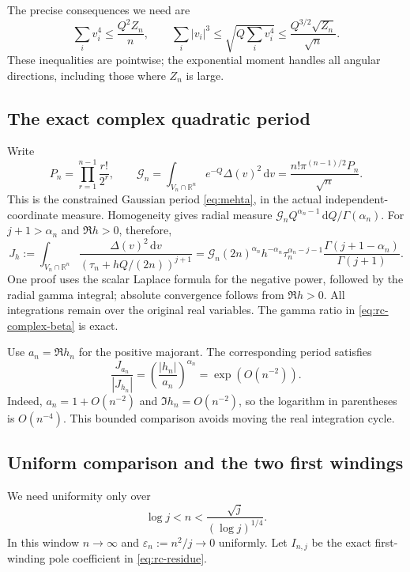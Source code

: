 \documentclass[11pt]{article}
\numberwithin{equation}{section}
\theoremstyle{definition}
\newcommand{\R}{\mathbb R}
\newcommand{\dd}{\,\mathrm d}
\begin{document}
The precise consequences we need are
\begin{equation}\label{eq:rc-angular-power-bounds}
 \sum_i v_i^4\le\frac{Q^2Z_n}{n},\qquad
 \sum_i|v_i|^3
 \le\sqrt{Q\sum_i v_i^4}
 \le\frac{Q^{3/2}\sqrt{Z_n}}{\sqrt n}.
\end{equation}
These inequalities are pointwise; the exponential moment handles
all angular directions, including those where $Z_n$ is large.

\subsection{The exact complex quadratic period}

Write
\[
 P_n=\prod_{r=1}^{n-1}\frac{r!}{2^r},\qquad
 \mathcal G_n=\int_{V_n\cap\R^n}e^{-Q}\Delta(v)^2\dd v
 =\frac{n!\pi^{(n-1)/2}P_n}{\sqrt n}.
\]
This is the constrained Gaussian period \eqref{eq:mehta}, in the
actual independent-coordinate measure.  Homogeneity gives radial
measure $\mathcal G_nQ^{\alpha_n-1}\dd Q/\Gamma(\alpha_n)$.
For $j+1>\alpha_n$ and $\Re h>0$, therefore,
\begin{equation}\label{eq:rc-complex-beta}
 J_h:=\int_{V_n\cap\R^n}
   \frac{\Delta(v)^2\dd v}{(\tau_n+hQ/(2n))^{j+1}}
 =\mathcal G_n(2n)^{\alpha_n}h^{-\alpha_n}
   \tau_n^{\alpha_n-j-1}
   \frac{\Gamma(j+1-\alpha_n)}{\Gamma(j+1)}.
\end{equation}
One proof uses the scalar Laplace formula for the negative power,
followed by the radial gamma integral; absolute convergence follows
from $\Re h>0$.  All integrations remain over the original real
variables.  The gamma ratio in \eqref{eq:rc-complex-beta} is exact.

Use $a_n=\Re h_n$ for the positive majorant.  The corresponding
period satisfies
\begin{equation}\label{eq:rc-phase-cost}
 \frac{J_{a_n}}{|J_{h_n}|}
 =\left(\frac{|h_n|}{a_n}\right)^{\alpha_n}
 =\exp(O(n^{-2})).
\end{equation}
Indeed, $a_n=1+O(n^{-2})$ and $\Im h_n=O(n^{-2})$, so the
logarithm in parentheses is $O(n^{-4})$.  This bounded comparison
avoids moving the real integration cycle.

\subsection{Uniform comparison and the two first windings}

We need uniformity only over
\begin{equation}\label{eq:rc-needed-window}
 \log j<n<\frac{\sqrt j}{(\log j)^{1/4}}.
\end{equation}
In this window $n\to\infty$ and $\varepsilon_n:=n^2/j\to0$
uniformly.  Let $I_{n,j}$ be the exact first-winding pole coefficient
in \eqref{eq:rc-residue}.
\end{document}
